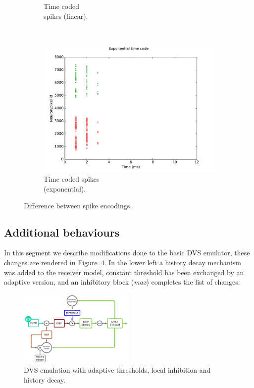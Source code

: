 \documentclass[twocolumn]{article}
\begin{document}
\begin{figure}[htb]
\begin{subfigure}[b]{0.25\textwidth}
    \caption{Time coded\\spikes (linear).}
    \label{fig:time_spikes}
  \end{subfigure}\\
  \begin{subfigure}[b]{0.25\textwidth}
    \includegraphics[width=\textwidth]{exp_time_code}
    \caption{Time coded spikes \\(exponential).}
    \label{fig:time_exp_spikes}
  \end{subfigure}
  
  \caption{Difference between spike encodings.}
  \label{fig:spike_codes}
\end{figure}

\subsection{Additional behaviours}

In this segment we describe modifications done to the basic DVS emulator, these changes are rendered in Figure~\ref{fig:dvs_emu_inh}. In the lower left a history decay mechanism was added to the receiver model, constant threshold has been exchanged by an adaptive version, and an inhibitory block (\textit{\textsf{max}}) completes the list of changes.

\begin{figure}[htb]
  
  \includegraphics[width=0.5\textwidth]{dvs_emu_decay_adapt_inh}
  \caption{DVS emulation with adaptive thresholds, local inhibition and history decay.}
  \label{fig:dvs_emu_inh}
\end{figure}
\end{document}
